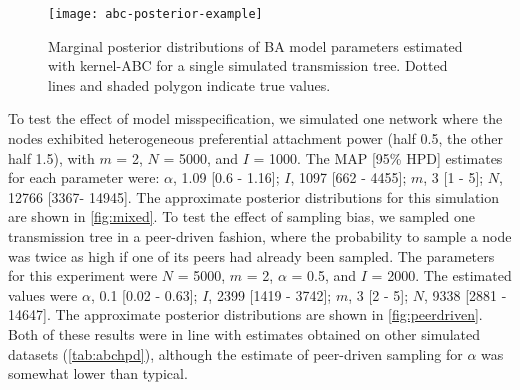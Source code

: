 \begin{figure}[ht]
    \centering
    \texttt{[image: abc-posterior-example]}
  \vspace{6pt}
  \caption{
    Marginal posterior distributions of BA model parameters estimated
    with kernel-ABC for a single simulated transmission tree. Dotted
    lines and shaded polygon indicate true values.
  }
  \label{fig:abcex}
\end{figure}



To test the effect of model misspecification, we simulated one network where
the nodes exhibited heterogeneous preferential attachment power (half 0.5, the
other half 1.5), with $m$ = 2, $N$ = 5000, and $I$ = 1000. The MAP [95\%
HPD] estimates for each parameter were: 
$\alpha$, 
  1.09 
  [0.6 -
   1.16];
$I$,
  1097 
  [662 -
   4455];
$m$,
  3 
  [1 -
   5];
$N$,
  12766 
  [3367-
   14945].
The approximate posterior distributions for this simulation are shown in
\cref{fig:mixed}. To test the effect of sampling bias, we sampled one
transmission tree in a peer-driven fashion, where the probability to sample a
node was twice as high if one of its peers had already been sampled. The
parameters for this experiment were $N$ = 5000, $m$ = 2, $\alpha$ = 0.5, and
$I$ = 2000. The estimated values were
$\alpha$, 
  0.1 
  [0.02 -
   0.63];
$I$,
  2399 
  [1419 -
   3742];
$m$,
  3 
  [2 -
   5];
$N$,
  9338 
  [2881 -
   14647].
The approximate posterior distributions are shown in \cref{fig:peerdriven}. Both
of these results were in line with estimates obtained on other simulated
datasets (\cref{tab:abchpd}), although the estimate of peer-driven sampling for
$\alpha$ was somewhat lower than typical.

